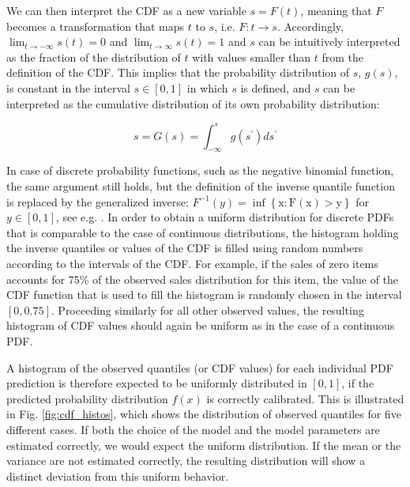 \documentclass[BCOR=1mm, DIV=calc,10pt,
twoside=true,
twocolumn,
headings=normal]{scrartcl}
\newcommand{\fig}{Fig. }
\begin{document}
We can then interpret the CDF as a new variable $s = F(t)$, meaning that $F$ becomes a transformation that maps $t$ to $s$, i.e. $F:t \to s$. Accordingly,  $\lim_{t \to -\infty}s(t) = 0$ and $\lim_{t \to \infty}s(t) = 1$ and $s$ can be intuitively interpreted as the fraction of the distribution of $t$ with values smaller than $t$ from the definition of the CDF. This implies that the probability distribution of $s$, $g(s)$, is constant in the interval $s \in [0,1]$ in which $s$ is defined, and $s$ can be interpreted as the cumulative distribution of its own probability distribution:

\begin{equation}
s = G(s) = \int_{-\infty}^{s} g(s^\prime) ds^\prime
\end{equation}

In case of discrete probability functions, such as the negative binomial function, the same argument still holds, but the definition of the inverse quantile function is replaced by the generalized inverse: $F^{-1}(y) = \mathrm{\inf \left \{x : F(x)>y\right  \} }$ for $y \in [0,1]$, see e.g. \cite[p. 54]{casella2002statistical}. In order to obtain a uniform distribution for discrete PDFs that is comparable to the case of continuous distributions, the histogram holding the inverse quantiles or values of the CDF is filled using random numbers according to the intervals of the CDF. For example, if the sales of zero items accounts for 75\% of the observed sales distribution for this item, the value of the CDF function that is used to fill the histogram is randomly chosen in the interval $[0,0.75]$. Proceeding similarly for all other observed values, the resulting histogram of CDF values should again be uniform as in the case of a continuous PDF.

A histogram of the observed quantiles (or CDF values) for each individual PDF prediction is therefore expected to be uniformly distributed in $[0,1]$, if the predicted probability distribution $f(x)$ is correctly calibrated. This is illustrated in \fig \ref{fig:cdf_histos}, which shows the distribution of observed quantiles for five different cases. If both the choice of the model and the model parameters are estimated correctly, we would expect the uniform distribution. If the mean or the variance are not estimated correctly, the resulting distribution will show a distinct deviation from this uniform behavior.
\end{document}
